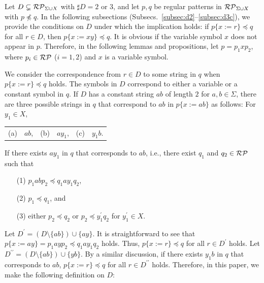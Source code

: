 
Let {\color{red}$D \subsetneq \mathcal{RP}_{\Sigma\cup X}$} with $\sharp D = 2$ or $3$, and let $p,q$ be regular patterns in {\color{red}$\mathcal{RP}_{\Sigma\cup X}$ with $p\not\preceq q$}.
In the following subsections (Subsecs.~\ref{subsec:d2}--\ref{subsec:d3c}), we provide the conditions on $D$ under which the implication holds: if $p \{ x := r \} \preceq q$ for all $r \in D$, then $p \{ x := xy \} \preceq q$.
It is obvious if the variable symbol $x$ does not appear in $p$.
Therefore, in the following lemmas and propositions, let $p=p_{1}xp_{2}$, where $p_{i}\in \mathcal{RP}$ ($i=1,2$) and $x$ is a variable symbol.

We consider the correspondence from $r\in D$ to some string in $q$ when $p \{ x := r \} \preceq q$ holds.
The symbols in $D$ correspond to either a variable or a constant symbol in $q$.
If $D$ has a constant string $ab$ of length $2$ for $a,b\in\Sigma$, there are three possible strings in $q$ that correspond to $ab$ in $p\{x:=ab\}$ as follows: For $y_{1} \in X$,
  \begin{center}
    \begin{tabular}{cccccc}
      \textrm{(a)} & $ab$, & \textrm{(b)} & $ay_{1}$, & \textrm{(c)} & $y_{1}b$.
    \end{tabular}
  \end{center}

\noindent
If there exists $ay_{1}$ in $q$ that corresponds to $ab$, i.e., there exist $q_{1}$ and $q_{2}\in \mathcal{RP}$ such that
  \begin{enumerate}
  \item[(1)] $p_{1}abp_{2} \preceq q_{1}ay_{1}q_{2}$, 
  \item[(2)] $p_{1} \preceq q_{1}$, and
  \item[(3)] either $p_{2} \preceq q_{2}$ or $p_{2} \preceq y_{1}^{\prime}q_{2}$ for $y_{1}^{\prime}\in X$.
  \end{enumerate}
Let $D^{\prime} = (D \setminus \{ab\}) \cup \{ay\}$.
It is straightforward to see that $p\{x:=ay\} = p_{1}ayp_{2} \preceq q_{1}ay_{1}q_{2}$ holds.
Thus, $p \{ x := r \} \preceq q$ for all $r \in D^{\prime}$ holds.
Let $D^{\prime\prime} = (D \setminus \{ab\}) \cup \{yb\}$.
By a similar discussion, if there exists $y_{1}b$ in $q$ that corresponds to $ab$, $p \{ x := r \} \preceq q$ for all $r \in D^{\prime\prime}$ holds.
Therefore, in this paper, we make the following definition on $D$:


